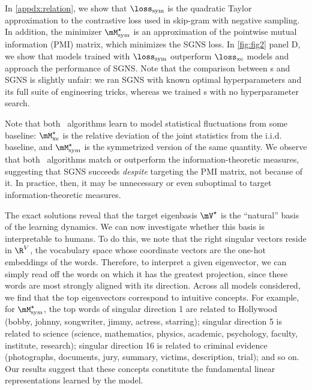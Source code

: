 In \cref{appdx:relation}, we show that $\losssym$ is the quadratic Taylor approximation to the contrastive loss used in skip-gram with negative sampling.
In addition, the minimizer $\Mstar_{\mathrm{sym}}$ is an approximation of the pointwise mutual information (PMI) matrix, which minimizes the SGNS loss. In \cref{fig:fig2} panel D, we show that models trained with $\losssym$ outperform $\lossxe$ models and approach the performance of SGNS.
Note that the comparison between \wem s and SGNS is slightly unfair: we ran SGNS with known optimal hyperparameters \citep{levy2015improving} and its full suite of engineering tricks, whereas we trained \wem s with no hyperparameter search.

Note that both \wem\ algorithms learn to model statistical fluctuations from some baseline: $\Mstarxe$ is the relative deviation of the joint statistics from the i.i.d. baseline, and $\Mstarsym$ is the symmetrized version of the same quantity.
We observe that both \wem\ algorithms match or outperform the information-theoretic measures, suggesting that SGNS succeeds \textit{despite} targeting the PMI matrix, not because of it. In practice, then, it may be unnecessary or even suboptimal to target information-theoretic measures.

The exact solutions reveal that the target eigenbasis $\mV^\star$ is the ``natural'' basis of the learning dynamics. We can now investigate whether this basis is interpretable to humans. To do this, we note that the right singular vectors reside in $\R^V$, the vocabulary space whose coordinate vectors are the one-hot embeddings of the words. Therefore, to interpret a given eigenvector, we can simply read off the words on which it has the greatest projection, since these words are most strongly aligned with its direction. Across all models considered, we find that the top eigenvectors correspond to intuitive concepts. For example, for $\Mstarsym$, the top words of singular direction 1 are related to Hollywood (bobby, johnny, songwriter, jimmy, actress, starring); singular direction 5 is related to science (science, mathematics, physics, academic, psychology, faculty, institute, research); singular direction 16 is related to criminal evidence (photographs, documents, jury, summary, victims, description, trial); and so on. Our results suggest that these concepts constitute the fundamental linear representations learned by the model.

\newpage
